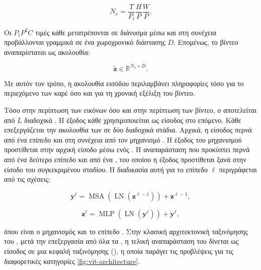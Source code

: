 \begin{equation}
    N_v=
    \frac{T}{P_t}\frac{H}{P}\frac{W}{P}.
    \label{eq:number-video-tokens}
\end{equation}

Οι \(P_tP^2C\) τιμές κάθε  μετατρέπονται σε διάνυσμα μέσω
 και στη συνέχεια προβάλλονται γραμμικά σε ένα χωροχρονικό
 διάστασης \(D\). Επομένως, το βίντεο αναπαρίσταται ως ακολουθία:

\begin{equation}
    \widetilde{\mathbf{z}}\in\mathbb{R}^{N_v\times D}.
    \label{eq:video-token-sequence}
\end{equation}

Με αυτόν τον τρόπο, η ακολουθία εισόδου περιλαμβάνει πληροφορίες τόσο για το
περιεχόμενο των καρέ όσο και για τη χρονική εξέλιξη του βίντεο.

Τόσο στην περίπτωση των εικόνων όσο και στην περίπτωση των βίντεο, ο
 αποτελείται από \(L\) διαδοχικά . Η
έξοδος κάθε  χρησιμοποιείται ως είσοδος στο επόμενο. 
Κάθε  επεξεργάζεται την ακολουθία των  σε
δύο διαδοχικά στάδια. Αρχικά, η είσοδος περνά από ένα επίπεδο  και στη συνέχεια από
τον μηχανισμό . Η έξοδος του μηχανισμού
προστίθεται στην αρχική είσοδο μέσω ενός . Η
αναπαράσταση που προκύπτει περνά από ένα δεύτερο επίπεδο
 και από ένα , του οποίου η έξοδος
προστίθεται ξανά στην είσοδο του συγκεκριμένου σταδίου. Η διαδικασία αυτή για
το επίπεδο \(\ell\) περιγράφεται από τις σχέσεις:

\begin{equation}
    \mathbf{y}^{\ell}
    =
    \operatorname{MSA}
    \left(
        \operatorname{LN}(\mathbf{z}^{\ell-1})
    \right)
    +
    \mathbf{z}^{\ell-1},
    \label{eq:vit-msa-block}
\end{equation}

\begin{equation}
    \mathbf{z}^{\ell}
    =
    \operatorname{MLP}
    \left(
        \operatorname{LN}(\mathbf{y}^{\ell})
    \right)
    +
    \mathbf{y}^{\ell},
    \label{eq:vit-mlp-block}
\end{equation}

όπου  είναι ο μηχανισμός  και 
το επίπεδο . Στην κλασική αρχιτεκτονική
ταξινόμησης του , μετά την επεξεργασία από όλα τα
, η τελική αναπαράσταση του  δίνεται
ως είσοδος σε μια κεφαλή ταξινόμησης (), η οποία
παράγει τις προβλέψεις για τις διαφορετικές κατηγορίες \ref{fig:vit-architecture}.

